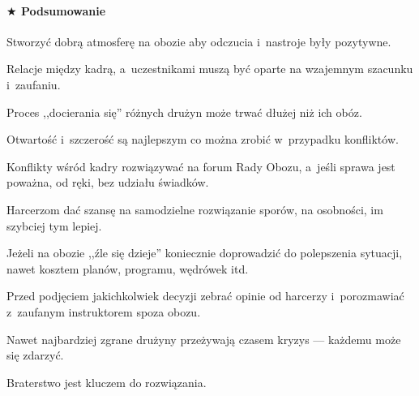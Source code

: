 \documentclass[a5paper,10pt,titlepage,twoside]{article}
\newcommand*{\thecheckbox}{\hss$\Box$} %
\newenvironment*{checklist}
{\list{}{%
\renewcommand*{\makelabel}[1]{\thecheckbox}}}
{\endlist}
\begin{document}
\paragraph{$\bigstar$ Podsumowanie}
\begin{checklist}
\item Stworzyć dobrą atmosferę na obozie aby odczucia i~nastroje były pozytywne.
\item Relacje między kadrą, a~uczestnikami muszą być oparte na wzajemnym szacunku i~zaufaniu.
\item Proces ,,docierania się'' różnych drużyn może trwać dłużej niż ich obóz.
\item Otwartość i~szczerość są najlepszym co można zrobić w~przypadku konfliktów.
\item Konflikty wśród kadry rozwiązywać na forum Rady Obozu, a~jeśli sprawa jest poważna, od ręki, bez udziału świadków.
\item Harcerzom dać szansę na samodzielne rozwiązanie sporów, na osobności, im szybciej tym lepiej.
\item Jeżeli na obozie ,,źle się dzieje'' koniecznie doprowadzić do polepszenia sytuacji, nawet kosztem planów, programu, wędrówek itd.
\item Przed podjęciem jakichkolwiek decyzji zebrać opinie od harcerzy i~porozmawiać z~zaufanym instruktorem spoza obozu.
\item Nawet najbardziej zgrane drużyny przeżywają czasem kryzys --- każdemu może się zdarzyć.
\item Braterstwo jest kluczem do rozwiązania.
\end{checklist}
\end{document}
